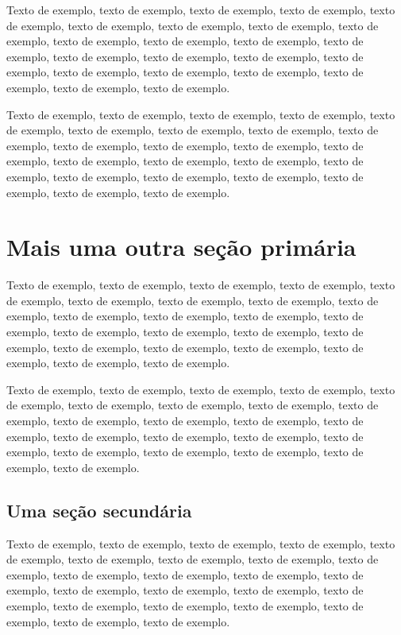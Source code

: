 \documentclass[
	12pt,				%
	oneside,			%
	a4paper,			%
	english,			%
	brazil				%
	]{abntex2ppgsi}
\begin{document}
Texto de exemplo, texto de exemplo, texto de exemplo, texto de exemplo, texto de exemplo, texto de exemplo, texto de exemplo, texto de exemplo, texto de exemplo, texto de exemplo, texto de exemplo, texto de exemplo, texto de exemplo, texto de exemplo, texto de exemplo, texto de exemplo, texto de exemplo, texto de exemplo, texto de exemplo, texto de exemplo, texto de exemplo, texto de exemplo, texto de exemplo.

Texto de exemplo, texto de exemplo, texto de exemplo, texto de exemplo, texto de exemplo, texto de exemplo, texto de exemplo, texto de exemplo, texto de exemplo, texto de exemplo, texto de exemplo, texto de exemplo, texto de exemplo, texto de exemplo, texto de exemplo, texto de exemplo, texto de exemplo, texto de exemplo, texto de exemplo, texto de exemplo, texto de exemplo, texto de exemplo, texto de exemplo.

\chapter{Mais uma outra seção primária}

Texto de exemplo, texto de exemplo, texto de exemplo, texto de exemplo, texto de exemplo, texto de exemplo, texto de exemplo, texto de exemplo, texto de exemplo, texto de exemplo, texto de exemplo, texto de exemplo, texto de exemplo, texto de exemplo, texto de exemplo, texto de exemplo, texto de exemplo, texto de exemplo, texto de exemplo, texto de exemplo, texto de exemplo, texto de exemplo, texto de exemplo.

Texto de exemplo, texto de exemplo, texto de exemplo, texto de exemplo, texto de exemplo, texto de exemplo, texto de exemplo, texto de exemplo, texto de exemplo, texto de exemplo, texto de exemplo, texto de exemplo, texto de exemplo, texto de exemplo, texto de exemplo, texto de exemplo, texto de exemplo, texto de exemplo, texto de exemplo, texto de exemplo, texto de exemplo, texto de exemplo.

\section{Uma seção secundária}

Texto de exemplo, texto de exemplo, texto de exemplo, texto de exemplo, texto de exemplo, texto de exemplo, texto de exemplo, texto de exemplo, texto de exemplo, texto de exemplo, texto de exemplo, texto de exemplo, texto de exemplo, texto de exemplo, texto de exemplo, texto de exemplo, texto de exemplo, texto de exemplo, texto de exemplo, texto de exemplo, texto de exemplo, texto de exemplo, texto de exemplo.
\end{document}
